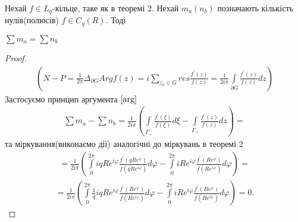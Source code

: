 \documentclass[12pt,a4paper]{article}
\begin{document}
\begin{thm}
Нехай $f\in L_{q}$-кільце, таке як в теоремі 2. Нехай $m_{a}(n_{b})$ позначають кількість нулів(полюсів) $f \in C_{q}(R)$. Тоді 
\begin{center}
$\sum m_{a}=\sum n_{b}$
\end{center}
\end{thm}
\begin{proof}

\begin{equation}\label{arg}
\begin{array}{l}                    
(N-P=\frac{1}{2\pi} \Delta_{\partial G} Arg f(z) =i\sum\limits_{z_k\in G} res \frac{f^{'}(z)}{f(z)} = \frac{1}{2i\pi}\int\limits_{\partial G}^{ }\frac{f^{'}(z)}{f(z)} dz) 
\end{array}
\end{equation}
Застосуємо принцип аргумента  $\eqref {arg} $
\[\begin{array}{l}
\sum m_{a}-\sum n_{b} = \frac{1}{2i\pi}(\int\limits_{\Gamma^{'}_{+}}^{ } \frac{f^{'}(\xi )}{f(\xi) }d\xi-\int\limits_{\Gamma_{+}}^{ } \frac{f^{'}(z)}{f(z)}dz)=
\end{array}\]
та міркування(виконаємо дії) аналогічні до міркувань в теоремі 2
\[\begin{array}{l}
= \frac{1}{2i\pi}(\int\limits_{0}^{2\pi }iqRe^{i\varphi}\frac{f^{'}(qRe^{\varphi})}{f(qRe^{i\varphi })}d\varphi -
    \int\limits_{0}^{2\pi }iRe^{i\varphi}\frac{f^{'}(Re^{\varphi})}{f(Re^{i\varphi })}d\varphi)=
\end{array}\]
\[\begin{array}{l}
= \frac{1}{2i\pi}(\int\limits_{0}^{2\pi }\frac{1}{q}iqRe^{i\varphi}\frac{f^{'}(Re^{\varphi})}{f(Re^{i\varphi })}d\varphi -
    \int\limits_{0}^{2\pi }iRe^{i\varphi}\frac{f^{'}(Re^{\varphi})}{f(Re^{i\varphi })}d\varphi)=0.
\end{array}\]
\end{proof}
\[\begin{array}{l}
\end{array} \]
\end{document}
